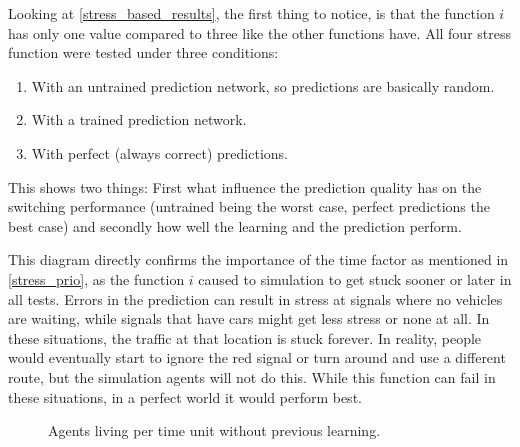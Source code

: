 Looking at \autoref{stress_based_results}, the first thing to notice, is that the function $i$ has only one value compared to three like the other functions have. All four stress function were tested under three conditions:

\begin{enumerate}
	\item With an untrained prediction network, so predictions are basically random.
	\item With a trained prediction network.
	\item With perfect (always correct) predictions.
\end{enumerate}

This shows two things: First what influence the prediction quality has on the switching performance (untrained being the worst case, perfect predictions the best case) and secondly how well the learning and the prediction perform.

This diagram directly confirms the importance of the time factor as mentioned in \autoref{stress_prio}, as the function $i$ caused to simulation to get stuck sooner or later in all tests. Errors in the prediction can result in stress at signals where no vehicles are waiting, while signals that have cars might get less stress or none at all. In these situations, the traffic at that location is stuck forever. In reality, people would eventually start to ignore the red signal or turn around and use a different route, but the simulation agents will not do this. While this function can fail in these situations, in a perfect world it would perform best.

\begin{figure}[ht!]
	\centering
	\label{agent_statistic_dumb}
	\caption{Agents living per time unit without previous learning.}
\end{figure}


